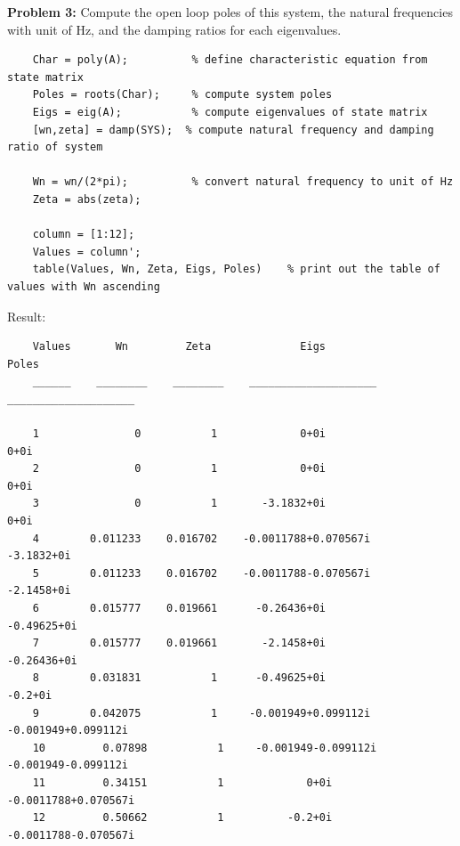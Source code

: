 \documentclass[14pt,a4paper]{article}
\begin{document}
\pagebreak
\large\textbf{Problem 3:} Compute the open loop poles of this system, the natural frequencies with unit of Hz, and the damping ratios for each eigenvalues.
	\begin{lstlisting}
	Char = poly(A);          % define characteristic equation from state matrix
	Poles = roots(Char);     % compute system poles
	Eigs = eig(A);           % compute eigenvalues of state matrix
	[wn,zeta] = damp(SYS);  % compute natural frequency and damping ratio of system
	
	Wn = wn/(2*pi);          % convert natural frequency to unit of Hz
	Zeta = abs(zeta);        
	
	column = [1:12];
	Values = column';
	table(Values, Wn, Zeta, Eigs, Poles)    % print out the table of values with Wn ascending
	\end{lstlisting}
	Result:
	\begin{lstlisting}
	Values       Wn         Zeta              Eigs                   Poles        
	______    ________    ________    ____________________    ____________________
	
	1               0           1             0+0i                    0+0i       
	2               0           1             0+0i                    0+0i       
	3               0           1       -3.1832+0i                    0+0i       
	4        0.011233    0.016702    -0.0011788+0.070567i       -3.1832+0i       
	5        0.011233    0.016702    -0.0011788-0.070567i       -2.1458+0i       
	6        0.015777    0.019661      -0.26436+0i             -0.49625+0i       
	7        0.015777    0.019661       -2.1458+0i             -0.26436+0i       
	8        0.031831           1      -0.49625+0i                 -0.2+0i       
	9        0.042075           1     -0.001949+0.099112i     -0.001949+0.099112i
	10         0.07898           1     -0.001949-0.099112i     -0.001949-0.099112i
	11         0.34151           1             0+0i           -0.0011788+0.070567i
	12         0.50662           1          -0.2+0i           -0.0011788-0.070567i
	\end{lstlisting}
\pagebreak
\end{document}
